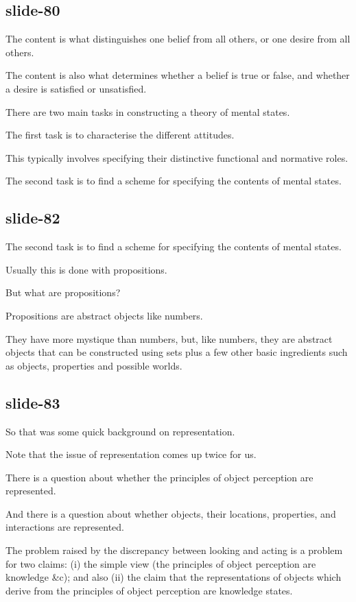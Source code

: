 \documentclass[12pt,\papersize]{extarticle}
\begin{document}
\subsection{slide-80}
The content is what distinguishes one belief from all others, or one desire from all others.

The content is also what determines whether a belief is true or false, and
whether a desire is satisfied or unsatisfied.

There are two main tasks in constructing a theory of mental states.

The first task is to characterise the different attitudes.

This typically involves specifying their distinctive functional and normative roles.

The second task is to find a scheme for specifying the contents of mental states.

\subsection{slide-82}
The second task is to find a scheme for specifying the contents of mental states.

Usually this is done with propositions.

But what are propositions?

Propositions are abstract objects like numbers.

They have more mystique than numbers, but, like numbers, they are abstract objects that can be constructed using sets plus a few other basic ingredients such as objects, properties and possible worlds.

\subsection{slide-83}
So that was some quick background on representation.

Note that the issue of representation comes up twice for us.

There is a question about whether the principles of object perception are represented.

And there is a question about whether objects, their locations, properties, and interactions are represented.

The problem raised by the discrepancy between looking and acting is a
problem for two claims:
(i) the simple view (the principles of object perception are knowledge \&c); and also
(ii) the claim that the representations of objects which derive from the
principles of object perception are knowledge states.
\end{document}
